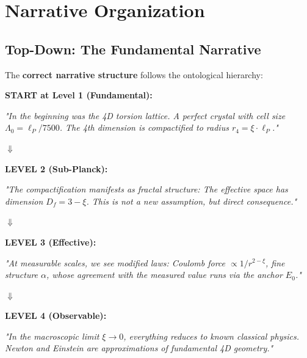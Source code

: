 	\section{Narrative Organization}
	
	\subsection{Top-Down: The Fundamental Narrative}
	
	The \textbf{correct narrative structure} follows the ontological hierarchy:
	
	\begin{revolutionary}
		\textbf{START at Level 1 (Fundamental):}
		
		\vspace{0.3cm}
		
		\textit{"In the beginning was the 4D torsion lattice. A perfect crystal with cell size $\Lambda_0 = \ell_P/7500$. The 4th dimension is compactified to radius $r_4 = \xi \cdot \ell_P$."}
		
		\vspace{0.3cm}
		
		$\Downarrow$
		
		\vspace{0.3cm}
		
		\textbf{LEVEL 2 (Sub-Planck):}
		
		\textit{"The compactification manifests as fractal structure: The effective space has dimension $D_f = 3-\xi$. This is not a new assumption, but direct consequence."}
		
		\vspace{0.3cm}
		
		$\Downarrow$
		
		\vspace{0.3cm}
		
		\textbf{LEVEL 3 (Effective):}
		
		\textit{"At measurable scales, we see modified laws: Coulomb force $\propto 1/r^{2-\xi}$, fine structure $\alpha$, whose agreement with the measured value runs via the anchor $E_0$."}
		
		\vspace{0.3cm}
		
		$\Downarrow$
		
		\vspace{0.3cm}
		
		\textbf{LEVEL 4 (Observable):}
		
		\textit{"In the macroscopic limit $\xi \to 0$, everything reduces to known classical physics. Newton and Einstein are approximations of fundamental 4D geometry."}
	\end{revolutionary}
	

